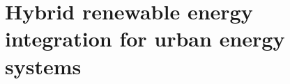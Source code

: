 \part{Hybrid renewable energy \mbox{integration} for urban energy systems}
\label{hybrid}


\cleardoublepage
{}

\cleardoublepage



\backmatter




